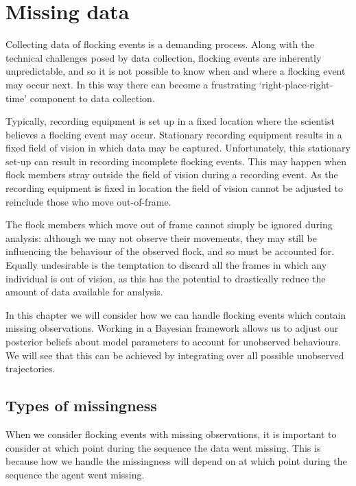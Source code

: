 \graphicspath{{fig/missing/}}

\chapter{Missing data}
\label{cha:missing}

Collecting data of flocking events is a demanding process. Along with the
technical challenges posed by data collection, flocking events are inherently
unpredictable, and so it is not possible to know when and where a flocking
event may occur next. In this way there can become a frustrating
`right-place-right-time' component to data collection.

Typically, recording equipment is set up in a fixed location where the
scientist believes a flocking event may occur. Stationary recording equipment
results in a fixed field of vision in which data may be captured.
Unfortunately, this stationary set-up can result in recording incomplete
flocking events. This may happen when flock members stray outside the field of
vision during a recording event. As the recording equipment is fixed in
location the field of vision cannot be adjusted to reinclude those who move
out-of-frame.

The flock members which move out of frame cannot simply be ignored during
analysis: although we may not observe their movements, they may still be
influencing the behaviour of the observed flock, and so must be accounted for.
Equally undesirable is the temptation to discard all the frames in which any
individual is out of vision, as this has the potential to drastically reduce
the amount of data available for analysis.

In this chapter we will consider how we can handle flocking events which
contain missing observations. Working in a Bayesian framework allows us to
adjust our posterior beliefs about model parameters to account for unobserved
behaviours. We will see that this can be achieved by integrating over all 
possible unobserved trajectories.

\section{Types of missingness}

When we consider flocking events with missing observations, it is important to
consider at which point during the sequence the data went missing. This is
because how we handle the missingness will depend on at which point during the
sequence the agent went missing.


